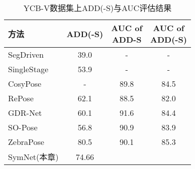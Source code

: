 \begin{table}
  \centering
  \caption{YCB-V数据集上ADD(-S)与AUC评估结果}
  \begin{tabular}{@{}l|c|c|c@{}}
    \toprule
     方法 & ADD(-S) & \makecell{AUC of\\ADD-S} & \makecell{AUC of\\ADD(-S)} \\
    \midrule
    SegDriven\cite{2019segmentation} & 39.0 &  - &  -  \\
    SingleStage\cite{hu2020single} & 53.9 &  - &  - \\
    CosyPose~\cite{labbe2020cosypose} & - &  89.8 &  84.5 \\
    RePose~\cite{iwase2021repose} & 62.1 &  88.5 &  82.0 \\
    GDR-Net~\cite{wang2021gdr} & 60.1 & 91.6 &  84.4 \\
    SO-Pose~\cite{Di_2021_ICCV} & 56.8 &  90.9 &  83.9 \\
    ZebraPose~\cite{su2022zebrapose} & 80.5 &  90.1 & 85.3  \\
    SymNet(本章) & 74.66 & 
    \bottomrule
  \end{tabular}
  \label{tab:ycbv_results_table}
\end{table}
